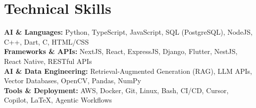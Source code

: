 \medskip

\resumeItemListStart
{}
\resumeItemListEnd
\resumeItemListEnd

\resumeSubHeadingListEnd

\section{Technical Skills}
\begin{itemize}[leftmargin=0.15in, label={}]
  \small{\item{
        \textbf{AI \& Languages:} {Python, TypeScript, JavaScript, SQL (PostgreSQL), NodeJS, C++, Dart, C, HTML/CSS} \\
        \textbf{Frameworks \& APIs:} {NextJS, React, ExpressJS, Django, Flutter, NestJS, React Native, RESTful APIs} \\
        \textbf{AI \& Data Engineering:} {Retrieval-Augmented Generation (RAG), LLM APIs, Vector Databases, OpenCV, Pandas, NumPy} \\
        \textbf{Tools \& Deployment:} {AWS, Docker, Git, Linux, Bash, CI/CD, Cursor, Copilot, \LaTeX\EndAccSupp{}, Agentic Workflows} \\
        }}
\end{itemize}
